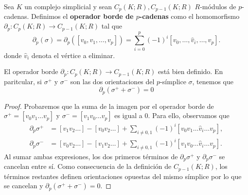 \begin{definicion}
	Sea \(K\) un complejo simplicial y sean \(C_{p}(K;R), C_{p-1}(K;R)\) \(R\)-módulos de
	\(p\)-cadenas. Definimos el \textbf{operador borde de \(p\)-cadenas} como el homomorfismo
	\(\partial_{p} : C_{p}(K;R) \to C_{p-1}(K;R)\) tal que
	\[
		\partial_{p}(\sigma) = \partial_{p}([v_{0}, v_{1}, \ldots, v_{p}]) = \sum_{i=0}
		^{p}(-1)^{i}[v_{0}, \ldots, \hat{v}_{i}, \ldots, v_{p}] .
	\]
	donde \(\hat{v}_{i}\) denota el vértice a eliminar.
\end{definicion}
%
\begin{lema}
	El operador borde \(\partial_{p} : C_{p}(K;R) \to C_{p-1}(K;R)\) está bien definido.
	En paritcular, si \(\sigma^{+}\) y \(\sigma^{-}\) son las dos orientaciones del \(p\)-símplice
	\(\sigma\), tenemos que
	\[
		\partial_{p}(\sigma^{+} +\sigma^{-}) = 0
	\]
\end{lema}
\begin{proof}
	Probaremos que la suma de la imagen por el operador borde de \(\sigma^{+} = [v_{0}
	v_{1}\ldots v_{p}]\) y \(\sigma^{-} = [v_{1}v_{0}\ldots v_{p}]\) es igual a \(0\). Para
	ello, observamos que
	\begin{align*}
		\partial_{p}\sigma^{+} & = [v_{1}v_{2}\ldots] - [v_{0}v_{2}\ldots] + \sum_{i\ne0,1}(-1)^{i}[v_{0}v_{1}\ldots \hat{v}_{i}\ldots v_{p}], \\
		\partial_{p}\sigma^{-} & = [v_{0}v_{2}\ldots] - [v_{1}v_{2}\ldots] + \sum_{i\ne0,1}(-1)^{i}[v_{1}v_{0}\ldots \hat{v}_{i}\ldots v_{p}].
	\end{align*}
	Al sumar ambas expresiones, los dos primeros términos de
	\(\partial_{p}\sigma^{+}\) y \(\partial_{p}\sigma^{-}\) se cancelan entre sí. Como
	consecuencia de la definición de \(C_{p-1}(K;R)\), los términos restantes
	definen orientaciones opuestas del mismo símplice por lo que se cancelan y
	\(\partial_{p}(\sigma^{+} +\sigma^{-})=0\).
\end{proof}

